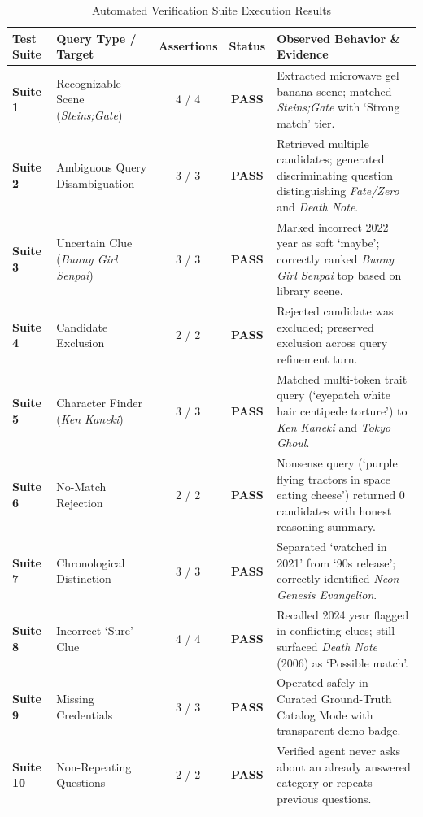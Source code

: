 \documentclass[11pt,a4paper]{article}
\begin{document}
\begin{table}[htbp]
\centering
\small
\caption{Automated Verification Suite Execution Results}
\label{tab:evaluation}
\begin{tabular}{@{}llccp{5.5cm}@{}}
\toprule
\textbf{Test Suite} & \textbf{Query Type / Target} & \textbf{Assertions} & \textbf{Status} & \textbf{Observed Behavior \& Evidence} \\
\midrule
\textbf{Suite 1} & Recognizable Scene (\textit{Steins;Gate}) & 4 / 4 & \textbf{PASS} & Extracted microwave gel banana scene; matched \textit{Steins;Gate} with `Strong match' tier. \\
\textbf{Suite 2} & Ambiguous Query Disambiguation & 3 / 3 & \textbf{PASS} & Retrieved multiple candidates; generated discriminating question distinguishing \textit{Fate/Zero} and \textit{Death Note}. \\
\textbf{Suite 3} & Uncertain Clue (\textit{Bunny Girl Senpai}) & 3 / 3 & \textbf{PASS} & Marked incorrect 2022 year as soft `maybe'; correctly ranked \textit{Bunny Girl Senpai} top based on library scene. \\
\textbf{Suite 4} & Candidate Exclusion & 2 / 2 & \textbf{PASS} & Rejected candidate was excluded; preserved exclusion across query refinement turn. \\
\textbf{Suite 5} & Character Finder (\textit{Ken Kaneki}) & 3 / 3 & \textbf{PASS} & Matched multi-token trait query (`eyepatch white hair centipede torture') to \textit{Ken Kaneki} and \textit{Tokyo Ghoul}. \\
\textbf{Suite 6} & No-Match Rejection & 2 / 2 & \textbf{PASS} & Nonsense query (`purple flying tractors in space eating cheese') returned 0 candidates with honest reasoning summary. \\
\textbf{Suite 7} & Chronological Distinction & 3 / 3 & \textbf{PASS} & Separated `watched in 2021' from `90s release'; correctly identified \textit{Neon Genesis Evangelion}. \\
\textbf{Suite 8} & Incorrect `Sure' Clue & 4 / 4 & \textbf{PASS} & Recalled 2024 year flagged in conflicting clues; still surfaced \textit{Death Note} (2006) as `Possible match'. \\
\textbf{Suite 9} & Missing Credentials & 3 / 3 & \textbf{PASS} & Operated safely in Curated Ground-Truth Catalog Mode with transparent demo badge. \\
\textbf{Suite 10} & Non-Repeating Questions & 2 / 2 & \textbf{PASS} & Verified agent never asks about an already answered category or repeats previous questions. \\

\end{tabular}
\end{table}
\end{document}
